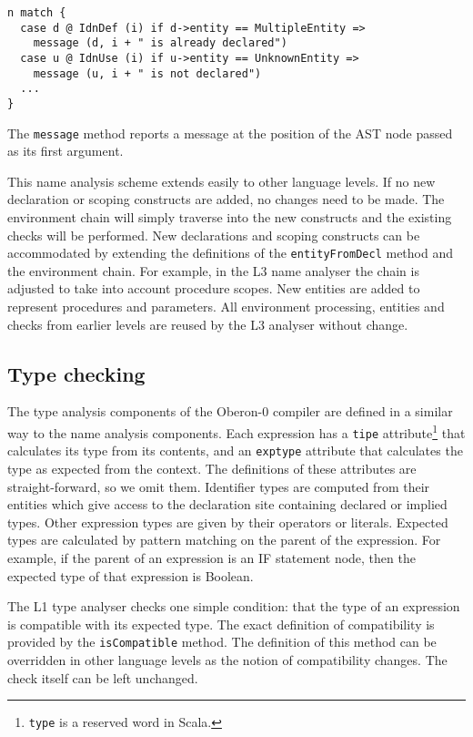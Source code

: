 \begin{verbatim}
n match {
  case d @ IdnDef (i) if d->entity == MultipleEntity =>
    message (d, i + " is already declared")
  case u @ IdnUse (i) if u->entity == UnknownEntity =>
    message (u, i + " is not declared")
  ...
}
\end{verbatim}

\noindent
The \verb|message| method reports a message at the position of the AST node passed as its first argument.

This name analysis scheme extends easily to other language levels.
If no new declaration or scoping constructs are added, no changes need to be made.
The environment chain will simply traverse into the new constructs and the existing checks will be performed.
New declarations and scoping constructs can be accommodated by extending the definitions of the \verb|entityFromDecl| method and the environment chain.
For example, in the L3 name analyser the chain is adjusted to take into account procedure scopes.
New entities are added to represent procedures and parameters.
All environment processing, entities and checks from earlier levels are reused by the L3 analyser without change.

\subsection{Type checking}

The type analysis components of the Oberon-0 compiler are defined in a similar way to the name analysis components.
Each expression has a \verb|tipe| attribute\footnote{\texttt{type} is a reserved word in Scala.} that calculates its type from its contents, and an \verb|exptype| attribute that calculates the type as expected from the context.
The definitions of these attributes are straight-forward, so we omit them.
Identifier types are computed from their entities which give access to the declaration site containing declared or implied types.
Other expression types are given by their operators or literals.
Expected types are calculated by pattern matching on the parent of the expression.
For example, if the parent of an expression is an IF statement node, then the expected type of that expression is Boolean.

The L1 type analyser checks one simple condition: that the type of an expression is compatible with its expected type.
The exact definition of compatibility is provided by the \verb|isCompatible| method.
The definition of this method can be overridden in other language levels as the notion of compatibility changes.
The check itself can be left unchanged.

